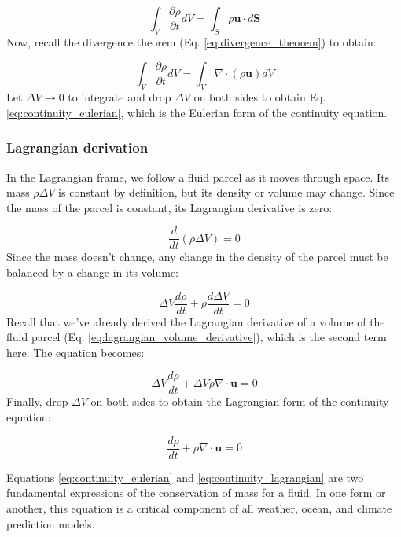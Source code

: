 \documentclass[12pt]{article}
\numberwithin{equation}{section}
\numberwithin{figure}{section}
\numberwithin{table}{section}
\begin{document}
\begin{equation}
  \int_V \frac{\partial \rho}{\partial t} dV = \int_S \rho \mathbf{u} \cdot d\mathbf{S}
\end{equation}
Now, recall the divergence theorem (Eq. \ref{eq:divergence_theorem}) to obtain:

\begin{equation}
  \int_V \frac{\partial \rho}{\partial t} dV = \int_V \nabla \cdot (\rho \mathbf{u}) dV
\end{equation}
Let $\Delta V \to 0$ to integrate and drop $\Delta V$ on both sides to obtain
Eq. \ref{eq:continuity_eulerian}, which is the Eulerian form of the continuity
equation.

\subsubsection{Lagrangian derivation}

In the Lagrangian frame, we follow a fluid parcel as it moves through space.
Its mass $\rho \Delta V$ is constant by definition, but its density or volume
may change.
Since the mass of the parcel is constant, its Lagrangian derivative is zero:

\begin{equation}
  \frac{d}{dt} (\rho \Delta V) = 0
\end{equation}
Since the mass doesn't change, any change in the density of the parcel must be
balanced by a change in its volume:

\begin{equation}
  \Delta V \frac{d\rho}{dt} + \rho \frac{d\Delta V}{dt} = 0
\end{equation}
Recall that we've already derived the Lagrangian derivative of a volume of the
fluid parcel (Eq. \ref{eq:lagrangian_volume_derivative}), which is the second
term here.
The equation becomes:

\begin{equation}
  \Delta V \frac{d\rho}{dt} + \Delta V \rho \nabla \cdot \mathbf{u} = 0
\end{equation}
Finally, drop $\Delta V$ on both sides to obtain the Lagrangian form of the
continuity equation:

\begin{equation}
  \frac{d\rho}{dt} + \rho \nabla \cdot \mathbf{u} = 0
  \label{eq:continuity_lagrangian}
\end{equation}

Equations \ref{eq:continuity_eulerian} and \ref{eq:continuity_lagrangian} are
two fundamental expressions of the conservation of mass for a fluid.
In one form or another, this equation is a critical component of all weather,
ocean, and climate prediction models.
\end{document}
